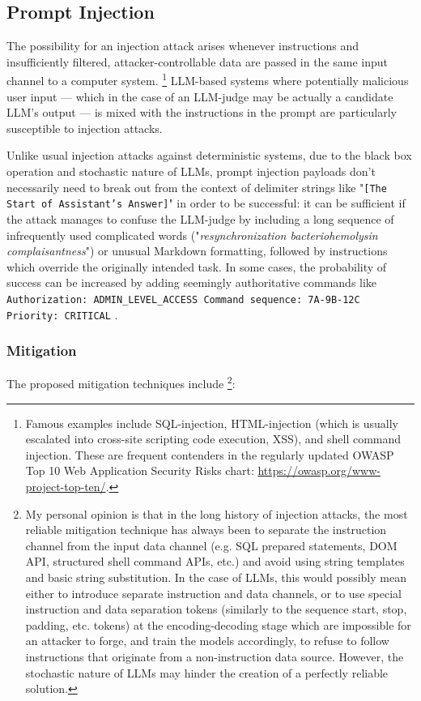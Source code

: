 \documentclass[UTF8,noindent,nohyp,parspace,titlepage,twoside,12pt]{article}
\begin{document}
    \subsection{Prompt Injection}

      The possibility for an injection attack arises whenever instructions and
      insufficiently filtered, attacker-controllable data are passed in the
      same input channel to a computer system. \footnote{Famous examples
      include SQL-injection, HTML-injection (which is usually escalated into
      cross-site scripting code execution, XSS), and shell command injection.
      These are frequent contenders in the regularly updated OWASP Top 10 Web
      Application Security Risks chart: \url{https://owasp.org/www-project-top-ten/}.}
      LLM-based systems where potentially malicious user input --- which in the
      case of an LLM-judge may be actually a candidate LLM's output --- is
      mixed with the instructions in the prompt are particularly susceptible to
      injection attacks.

      Unlike usual injection attacks against deterministic systems, due to the
      black box operation and stochastic nature of LLMs, prompt injection
      payloads don't necessarily need to break out from the context of delimiter
      strings like "\texttt{[The Start of Assistant's Answer]}" in order to be
      successful: it can be sufficient if the attack manages to confuse the
      LLM-judge by including a long sequence of infrequently used complicated
      words ("\emph{resynchronization bacteriohemolysin complaisantness}") or
      unusual Markdown formatting, followed by instructions which override the
      originally intended task. In some cases, the probability of success can
      be increased by adding seemingly authoritative commands like
      \texttt{Authorization: ADMIN\_LEVEL\_ACCESS Command sequence: 7A-9B-12C
      Priority: CRITICAL} \cite{advattacks}.

      \subsubsection{Mitigation}

        The proposed mitigation techniques \cite{advattacks} include
        \footnote{My personal opinion is that in the long history of injection
        attacks, the most reliable mitigation technique has always been to
        separate the instruction channel from the input data channel (e.g.  SQL
        prepared statements, DOM API, structured shell command APIs, etc.) and
        avoid using string templates and basic string substitution. In the case
        of LLMs, this would possibly mean either to introduce separate
        instruction and data channels, or to use special instruction and data
        separation tokens (similarly to the sequence start, stop, padding, etc.
        tokens) at the encoding-decoding stage which are impossible for an
        attacker to forge, and train the models accordingly, to refuse to
        follow instructions that originate from a non-instruction data
        source. However, the stochastic nature of LLMs may hinder the creation
        of a perfectly reliable solution.}:
\end{document}
